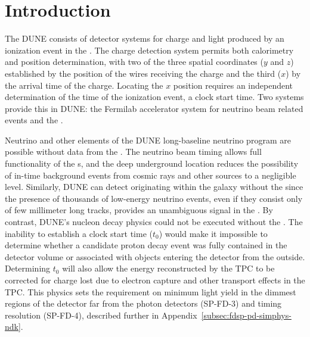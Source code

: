 \newcommand{\tzero}{\ensuremath{t_0}\xspace}

\section{Introduction} %
\label{sec:fdsp-pd-intro}

The DUNE  consists of detector systems for charge and light produced by an ionization event in the \lartpc.  The charge detection system permits both calorimetry and position determination, with two of the three spatial coordinates ($y$ and $z$)  established by the position of the  wires receiving the charge and the third ($x$) by the arrival time of the charge.  Locating the $x$ position requires an independent determination of the time of the ionization event, a clock start time.  Two systems provide this in DUNE:  the Fermilab accelerator system for neutrino beam related events and the .  

Neutrino  and other elements of the DUNE long-baseline neutrino program are possible without data from the .  The neutrino beam timing allows full functionality of the s, and the deep underground location reduces the possibility of in-time background events from cosmic rays and other sources to a negligible level.  
Similarly, DUNE can detect  originating within the galaxy without the  since the presence of thousands of low-energy neutrino events, even if they consist only of few millimeter long tracks, provides an unambiguous signal in the .
By contrast, DUNE's nucleon decay physics could not be executed without the .  The inability to establish a clock start time (\tzero) would make it impossible to determine whether a candidate proton decay event was fully contained in the detector volume or associated with objects entering the detector from the outside.  Determining \tzero will also allow the energy reconstructed by the TPC to be corrected for charge lost due to electron capture and other transport effects in the TPC. This physics sets the requirement on minimum light yield in the dimmest regions of the detector far from the photon detectors (SP-FD-3) and timing resolution (SP-FD-4), described further in Appendix~\ref{subsec:fdsp-pd-simphys-ndk}.

